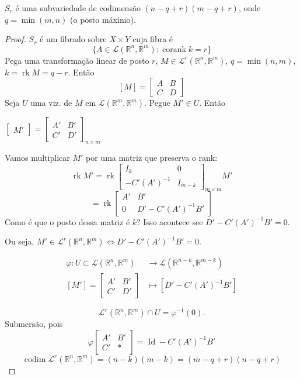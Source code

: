 \begin{prop}\leavevmode
\(S_r\) é uma subvariedade de codimensão \((n-q+r)(m-q+r)\), onde \(q=\operatorname{min}(m,n)\) (o posto máximo).
\end{prop}

\begin{proof}\leavevmode
\(S_r\) é um fibrado sobre \(X \times Y\) cuja fibra é
\[\{A \in \mathcal{L}(\mathbb{R}^n,\mathbb{R}^m): \operatorname{corank}k=r\}\]
Pega uma transformação linear de posto $r$, \(M \in \mathcal{L}^r( \mathbb{R}^n , \mathbb{R}^m)\), \(q = \operatorname{min} (n,m)\), \(k = \operatorname{rk} M= q-r\). Então
\[[M]=\begin{bmatrix} A& B\\C & D \end{bmatrix} \]
Seja \(U\) uma viz. de \(M\) em \(\mathcal{L} (\mathbb{R}^m,\mathbb{R}^m)\). Pegue \(M' \in U\). Então

\(\begin{bmatrix} M' \end{bmatrix} = \begin{bmatrix} A' & B'\\ C' & D' \end{bmatrix}_{n \times m}\) 

Vamos multiplicar \(M'\) por uma matriz que preserva o rank:
\[\operatorname{rk}M'=\operatorname{rk} \begin{bmatrix} I_k& 0\\-C'(A')^{-1} &  I_{m-k} \end{bmatrix}_{m \times m}M'\]
\[=\operatorname{rk} \begin{bmatrix} A' & B'\\0 & D'-C'(A')^{-1} B' \end{bmatrix} \]
{\color{7}Como é que o posto dessa matriz é \(k\)?} Isso acontece see  \(D'-C'(A')^{-1}B'=0\).

Ou seja, \(M' \in \mathcal{L}^r(\mathbb{R}^n,\mathbb{R}^m) \iff D'-C'(A')^{-1}B'=0\).

\begin{align*}
	\varphi: U \subset \mathcal{L}(\mathbb{R}^n,\mathbb{R}^m) &\longrightarrow \mathcal{L}(\mathbb{R}^{n-k},\mathbb{R}^{m-k}) \\
	[M']=\begin{bmatrix} A' & B'\\ C' & D' \end{bmatrix}  &\longmapsto [D' - C'(A')^{-1}B']
\end{align*}

\[\mathcal{L}^r(\mathbb{R}^n,\mathbb{R}^m) \cap U = \varphi^{-1}(0).\]
Submersão, pois
\[\varphi \begin{bmatrix} A' & B' \\ C' & * \end{bmatrix} =\operatorname{Id}- C' (A')^{-1}B'\]
\[\operatorname{codim} \mathcal{L}^r(\mathbb{R}^n,\mathbb{R}^m)=(n-k)(m-k)=(m-q+r)(n-q+r)\]
\end{proof}

